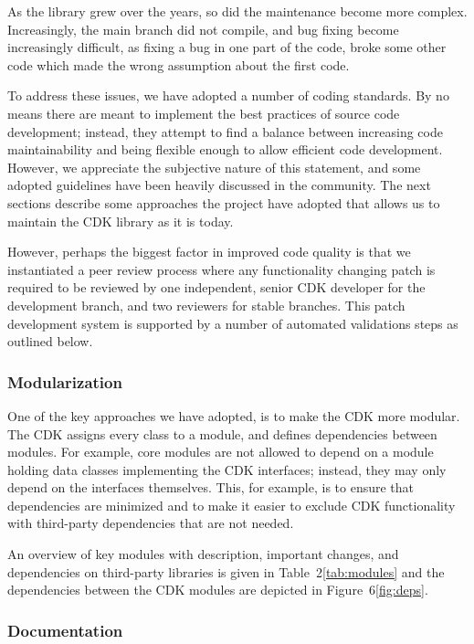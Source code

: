 \documentclass[10pt]{bmcart}
\begin{document}
As the library grew over the years, so did the maintenance become more complex. Increasingly,
the main branch did not compile, and bug fixing become increasingly difficult, as fixing a bug
in one part of the code, broke some other code which made the wrong assumption about the first
code.

To address these issues, we have adopted a number of coding standards. By no means there are
meant to implement the best practices of source code development; instead, they attempt to find
a balance between increasing code maintainability and being flexible enough to allow efficient
code development. However, we appreciate the subjective nature of this statement, and some
adopted guidelines have been heavily discussed in the community.
The next sections describe some approaches the project have adopted that allows us to
maintain the CDK library as it is today. 

However, perhaps the biggest factor in improved code quality is that we
instantiated a peer review process where any functionality changing patch is
required to be reviewed by one independent, senior CDK developer for  the development
branch, and two reviewers for stable branches. This patch development system
is supported by a number of automated validations steps as outlined below.

  \subsubsection*{Modularization}
  
One of the key approaches we have adopted, is to make the CDK more modular. The CDK assigns
every class to a module, and defines dependencies between modules. For example, core modules
are not allowed to depend on a module holding data classes implementing the CDK interfaces;
instead, they may only depend on the interfaces themselves. This, for example, is to ensure
that dependencies are minimized and to make it easier to exclude CDK functionality with
third-party dependencies that are not needed.

An overview of key modules with description, important changes, and dependencies
on third-party libraries is given in Table~2\ref{tab:modules} and the dependencies
between the CDK modules are depicted in Figure~6\ref{fig:deps}.

  \subsubsection*{Documentation}
\end{document}
